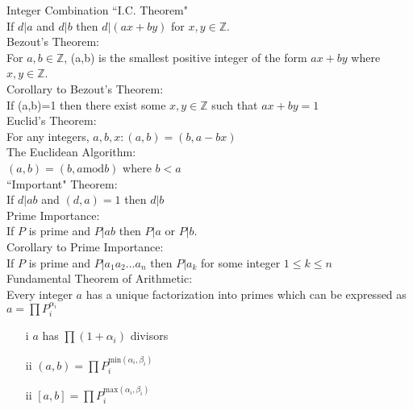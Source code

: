 \documentclass[12pt]{article}
\def \z{\mathbb{Z}}
\def \no{\noindent}
\begin{document}
\no  Integer Combination ``I.C. Theorem"\\
\hangindent=1cm If $d|a$ and $d|b$ then $d|(ax + by)$ for $x,y \in \z$.\\

\no  Bezout's Theorem:\\
\hangindent=1cm For $a,b \in \z$, (a,b) is the smallest positive integer of the form $ax+by$ where $x,y \in \z$.\\

\no Corollary to Bezout's Theorem:\\
\hangindent=1cm If (a,b)=1 then there exist some $x,y \in \z$ such that $ax + by = 1$\\

\no  Euclid's Theorem:\\
\hangindent=1cm For any integers, $a, b, x: (a, b) = (b, a - bx)$\\

\no The Euclidean Algorithm:\\
\hangindent=1cm $(a, b)=(b, a \text{mod} b)$ where $b<a$\\

\no  ``Important" Theorem:\\
\hangindent=1cm  If $d|ab$ and $(d,a) = 1$ then $d|b$\\

\no  Prime Importance:\\
\hangindent=1cm If $P$ is prime and $P|ab$ then $P|a$ or $P|b$.\\

\no Corollary to Prime Importance:\\
\hangindent=1cm If $P$ is prime and $P|a_1a_2...a_n$ then $P|a_k$ for some integer $1 \leq k \leq n$\\

\no  Fundamental Theorem of Arithmetic:\\
\hangindent=1cm Every integer $a$ has a unique factorization into primes which can be expressed as $a = \prod P_i^{\alpha_i}$
 \begin{itemize}
	\item[i] $a$ has $\prod (1+\alpha_i)$ divisors
	\item[ii] $ (a, b) = \prod P_i^{\text{min}(\alpha_i,\beta_i)}$
	\item[ii] $ [a,b] = \prod P_i^{\text{max}(\alpha_i,\beta_i)}$
\end{itemize}


\no 
\hangindent=1cm
\end{document}
